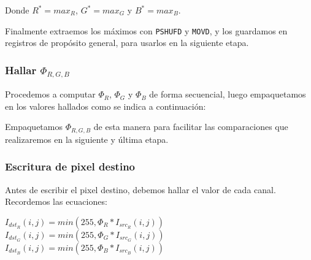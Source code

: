 Donde $R^\ast = max_R$, $G^\ast = max_G$ y $B^\ast = max_B$.

Finalmente extraemos los máximos con \texttt{PSHUFD} y \texttt{MOVD},
y los guardamos en registros de propósito general, para usarlos en la
siguiente etapa.




\subsubsection{Hallar $\Phi_{R,G,B}$}

Procedemos a computar $\Phi_R$, $\Phi_G$ y $\Phi_B$ de forma secuencial,
luego empaquetamos en  los valores hallados como se indica a continuación:

\begin{center}
\end{center}

Empaquetamos $\Phi_{R,G,B}$ de esta manera para facilitar las
comparaciones que realizaremos en la siguiente y última etapa.




\subsubsection{Escritura de pixel destino}

Antes de escribir el pixel destino, debemos hallar el valor de cada canal.
Recordemos las ecuaciones:

\begin{center}
    $I_{dst_R}(i, j) = min(255, \Phi_R \ast I_{src_R}(i, j))$ \\
    $I_{dst_G}(i, j) = min(255, \Phi_G \ast I_{src_G}(i, j))$ \\
    $I_{dst_B}(i, j) = min(255, \Phi_B \ast I_{src_B}(i, j))$
\end{center}

